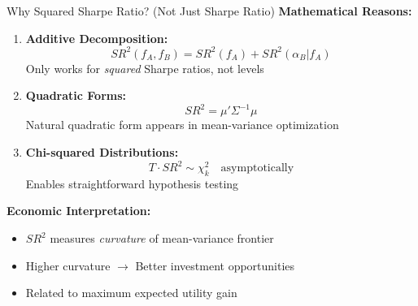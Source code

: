 \documentclass{beamer}
\begin{document}
\begin{frame}{Why Squared Sharpe Ratio? (Not Just Sharpe Ratio)}
    \textbf{Mathematical Reasons:}
    
    
    \begin{enumerate}
        \item \textbf{Additive Decomposition:}
        \begin{equation*}
            SR^2(f_A, f_B) = SR^2(f_A) + SR^2(\alpha_B | f_A)
        \end{equation*}
        Only works for \textit{squared} Sharpe ratios, not levels
        
        \item \textbf{Quadratic Forms:}
        \begin{equation*}
            SR^2 = \mu' \Sigma^{-1} \mu
        \end{equation*}
        Natural quadratic form appears in mean-variance optimization
        
        \item \textbf{Chi-squared Distributions:}
        \begin{equation*}
            T \cdot SR^2 \sim \chi^2_k \quad \text{asymptotically}
        \end{equation*}
        Enables straightforward hypothesis testing
    \end{enumerate}
    
    \vspace{0.3cm}
    \textbf{Economic Interpretation:}
    \begin{itemize}
        \item $SR^2$ measures \textit{curvature} of mean-variance frontier
        \item Higher curvature $\rightarrow$ Better investment opportunities
        \item Related to maximum expected utility gain
    \end{itemize}
\end{frame}
\end{document}
